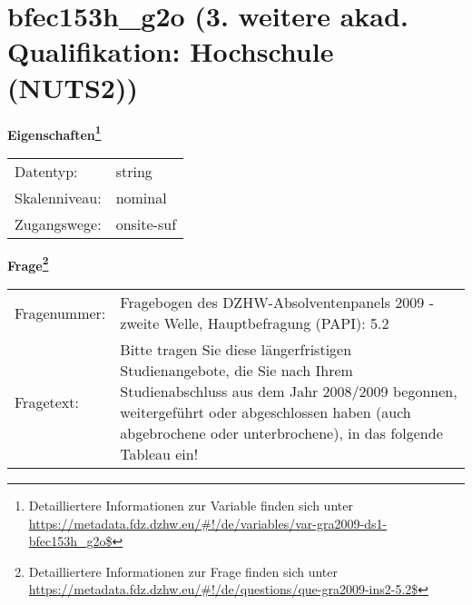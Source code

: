 
    \setcounter{footnote}{0}

    \vspace*{-1.8cm}
	\section{bfec153h\_g2o (3. weitere akad. Qualifikation: Hochschule (NUTS2))}
	\label{section:bfec153h_g2o}



    \vspace*{0.5cm}
    \noindent\textbf{Eigenschaften\footnote{Detailliertere Informationen zur Variable finden sich unter
		\url{https://metadata.fdz.dzhw.eu/\#!/de/variables/var-gra2009-ds1-bfec153h_g2o$}}}\\
	\begin{tabularx}{\hsize}{@{}lX}
	Datentyp: & string \\
	Skalenniveau: & nominal \\
	Zugangswege: &
	  onsite-suf
 \\
    \end{tabularx}



				\vspace*{0.5cm}
                \noindent\textbf{Frage\footnote{Detailliertere Informationen zur Frage finden sich unter
		              \url{https://metadata.fdz.dzhw.eu/\#!/de/questions/que-gra2009-ins2-5.2$}}}\\
				\begin{tabularx}{\hsize}{@{}lX}
					Fragenummer: &
					  Fragebogen des DZHW-Absolventenpanels 2009 - zweite Welle, Hauptbefragung (PAPI):
					  5.2
 \\
					Fragetext: & Bitte tragen Sie diese längerfristigen Studienangebote, die Sie nach Ihrem Studienabschluss aus dem Jahr 2008/2009 begonnen, weitergeführt oder abgeschlossen haben (auch abgebrochene oder unterbrochene), in das folgende Tableau ein! \\
				\end{tabularx}





